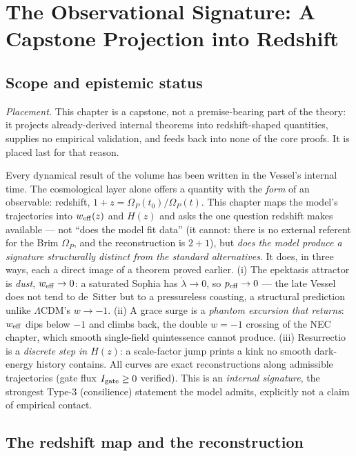 \documentclass[11pt,a4paper,oneside]{book}
\newcommand{\Op}{\Omega_P}
\newcommand{\weff}{w_{\rm eff}}
\theoremstyle{plain}
\theoremstyle{definition}
\theoremstyle{remark}
\begin{document}
\chapter{The Observational Signature: A Capstone Projection into Redshift}

\section*{Scope and epistemic status}
\emph{Placement.} This chapter is a capstone, not a premise-bearing part of the theory: it projects
already-derived internal theorems into redshift-shaped quantities, supplies no empirical validation, and
feeds back into none of the core proofs. It is placed last for that reason.

Every dynamical result of the volume has been written in the Vessel's internal time. The cosmological
layer alone offers a quantity with the \emph{form} of an observable: redshift, $1+z=\Op(t_0)/\Op(t)$.
This chapter maps the model's trajectories into $\weff(z)$ and $H(z)$ and asks the one question redshift
makes available --- not ``does the model fit data'' (it cannot: there is no external referent for the
Brim $\Op$, and the reconstruction is $2{+}1$), but \emph{does the model produce a signature
structurally distinct from the standard alternatives}. It does, in three ways, each a direct image of
a theorem proved earlier. (i) The epektasis attractor is \emph{dust}, $\weff\to0$: a saturated Sophia
has $\dot\lambda\to0$, so $p_{\rm eff}\to0$ --- the late Vessel does not tend to de~Sitter but to a
pressureless coasting, a structural prediction unlike $\Lambda$CDM's $w\to-1$. (ii) A grace surge is a
\emph{phantom excursion that returns}: $\weff$ dips below $-1$ and climbs back, the double
$w=-1$ crossing of the NEC chapter, which smooth single-field quintessence cannot produce. (iii)
Resurrectio is a \emph{discrete step in $H(z)$}: a scale-factor jump prints a kink no smooth dark-energy
history contains. All curves are exact reconstructions along admissible trajectories (gate flux
$I_{\rm gate}\ge0$ verified). This is an \emph{internal signature}, the strongest Type-3 (consilience)
statement the model admits, explicitly not a claim of empirical contact.

\section{The redshift map and the reconstruction}
\end{document}
